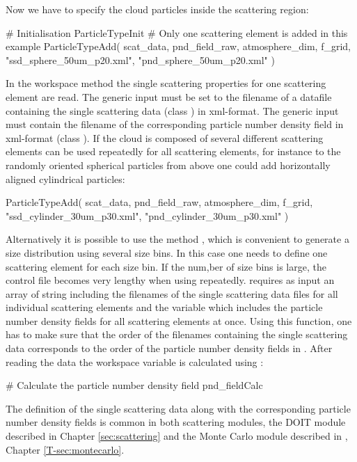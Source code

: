 Now we have to specify the cloud particles inside the scattering
region:
\begin{code}
# Initialisation
ParticleTypeInit
# Only one scattering element is added in this example 
ParticleTypeAdd( scat_data, pnd_field_raw,
                 atmosphere_dim, f_grid,
                 "ssd_sphere_50um_p20.xml",
                 "pnd_sphere_50um_p20.xml" )
\end{code}
In the workspace method  the single
scattering properties for one scattering element are read. The
generic input  must be set to
the filename of a datafile containing the single scattering data (class
) in xml-format. The generic input
 must contain the filename of the
corresponding particle number density field in xml-format (class
). If the cloud is composed of several
different scattering elements  can be used
repeatedly for all scattering elements, for instance to the
randomly oriented spherical particles from above one could add horizontally aligned
cylindrical particles:
\begin{code}
ParticleTypeAdd( scat_data, pnd_field_raw,
                 atmosphere_dim, f_grid,
                 "ssd_cylinder_30um_p30.xml",
                 "pnd_cylinder_30um_p30.xml" )
\end{code}
Alternatively it is possible to use the method
, which is convenient to generate a size
distribution using several size bins. In this case one needs to define
one scattering element for each size bin. If the num,ber of size bins is large,
the control file
becomes very lengthy when using 
repeatedly.  requires as input an array
of string including the filenames of the single scattering data files for all
individual scattering elements
and the variable  which includes the particle
number density fields for all scattering elements at once. Using this function, one
has to make sure that the order of the filenames containing the single
scattering data corresponds to the order of the particle number
density fields in .
After reading the data the workspace variable  is
calculated using : 
\begin{code}
# Calculate the particle number density field
pnd_fieldCalc
\end{code}

The definition of the single scattering data along with the
corresponding particle number density fields is common in both
scattering modules, the DOIT module described in 
Chapter \ref{sec:scattering} and the Monte Carlo module described in
\theory, Chapter \ref{T-sec:montecarlo}.



